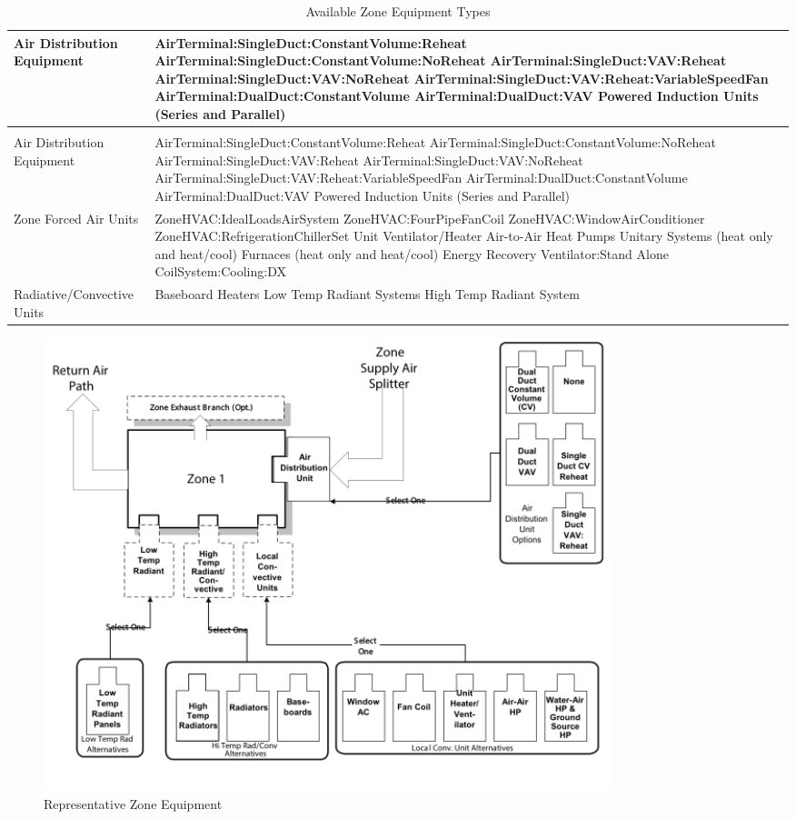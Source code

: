 \begin{longtable}[c]{p{1.5in}p{4.5in}}
\caption{Available Zone Equipment Types \label{table:available-zone-equipment-types}} \tabularnewline
\toprule
Air Distribution Equipment & AirTerminal:SingleDuct:ConstantVolume:Reheat     AirTerminal:SingleDuct:ConstantVolume:NoReheat    AirTerminal:SingleDuct:VAV:Reheat    AirTerminal:SingleDuct:VAV:NoReheat    AirTerminal:SingleDuct:VAV:Reheat:VariableSpeedFan    AirTerminal:DualDuct:ConstantVolume    AirTerminal:DualDuct:VAV    Powered Induction Units (Series and Parallel) \tabularnewline
\midrule
\endfirsthead

\caption[]{Available Zone Equipment Types} \tabularnewline
\toprule
Air Distribution Equipment & AirTerminal:SingleDuct:ConstantVolume:Reheat    AirTerminal:SingleDuct:ConstantVolume:NoReheat    AirTerminal:SingleDuct:VAV:Reheat    AirTerminal:SingleDuct:VAV:NoReheat    AirTerminal:SingleDuct:VAV:Reheat:VariableSpeedFan    AirTerminal:DualDuct:ConstantVolume    AirTerminal:DualDuct:VAV    Powered Induction Units (Series and Parallel) \tabularnewline
\midrule
\endhead

Zone Forced Air Units ~ & ZoneHVAC:IdealLoadsAirSystem    ZoneHVAC:FourPipeFanCoil    ZoneHVAC:WindowAirConditioner    ZoneHVAC:RefrigerationChillerSet    Unit Ventilator/Heater    Air-to-Air Heat Pumps    Unitary Systems (heat only and heat/cool)    Furnaces (heat only and heat/cool)    Energy Recovery Ventilator:Stand Alone    CoilSystem:Cooling:DX \tabularnewline
Radiative/Convective Units & Baseboard Heaters    Low Temp Radiant Systems    High Temp Radiant System \tabularnewline
\bottomrule
\end{longtable}

\begin{figure}[hbtp]
\centering
\includegraphics[width=0.8\textwidth, keepaspectratio=true]{media/image262.png}
\caption{Representative Zone Equipment \protect \label{fig:representative-zone-equipment}}
\end{figure}

